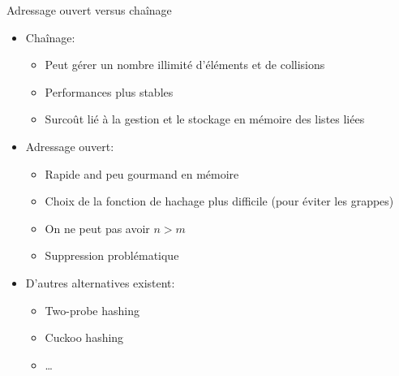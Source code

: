 \begin{frame}{Adressage ouvert versus chaînage}
\begin{itemize}
\item Chaînage:
\begin{itemize}
\item Peut gérer un nombre illimité d'éléments et de collisions
\item Performances plus stables
\item Surcoût lié à la gestion et le stockage en mémoire des listes liées
\end{itemize}
\item Adressage ouvert:
\begin{itemize}
\item Rapide and peu gourmand en mémoire
\item Choix de la fonction de hachage plus difficile (pour éviter les grappes)
\item On ne peut pas avoir $n>m$
\item Suppression problématique
\end{itemize}

\bigskip

\item D'autres alternatives existent:
\begin{itemize}
\item Two-probe hashing
\item Cuckoo hashing
\item \ldots
\end{itemize}
\end{itemize}


\end{frame}

